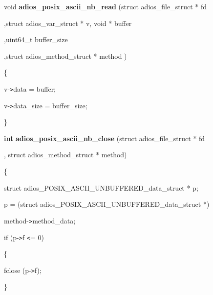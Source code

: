 \vspace{23pt}
void {\color{color02} \textbf{adios\_posix\_ascii\_nb\_read}}\textbf{ }{\color{color02} (struct 
adios\_file\_struct * fd}

\vspace{10pt}
\parindent=115pt
{\color{color02} ,struct adios\_var\_struct * v, void * buffer}

\vspace{10pt}
\parindent=118pt
{\color{color02} ,uint64\_t buffer\_size}

\vspace{10pt}
{\color{color02} ,struct adios\_method\_struct * method )}

\vspace{10pt}
\parindent=0pt
\{

\vspace{10pt}
\parindent=14pt
v-\texttt{>}data = buffer;

\vspace{10pt}
v-\texttt{>}data\_size = buffer\_size; 

\vspace{10pt}
\parindent=0pt
\}

\vspace{23pt}
\textbf{int}{\color{color02} \textbf{ adios\_posix\_ascii\_nb\_close}} {\color{color02} (struct 
adios\_file\_struct * fd}

\vspace{10pt}
\parindent=194pt
{\color{color02} , struct adios\_method\_struct * method)}

\vspace{10pt}
\parindent=0pt
\{

\vspace{10pt}
struct adios\_POSIX\_ASCII\_UNBUFFERED\_data\_struct * p;

\vspace{10pt}
\parindent=14pt
p = (struct adios\_POSIX\_ASCII\_UNBUFFERED\_data\_struct *)

\vspace{10pt}
\parindent=208pt
method-\texttt{>}method\_data;

\vspace{10pt}
\parindent=14pt
if (p-\texttt{>}f \texttt{<}= 0)

\vspace{10pt}
\{

\vspace{10pt}
\parindent=43pt
fclose (p-\texttt{>}f);

\vspace{10pt}
\parindent=14pt
\}


